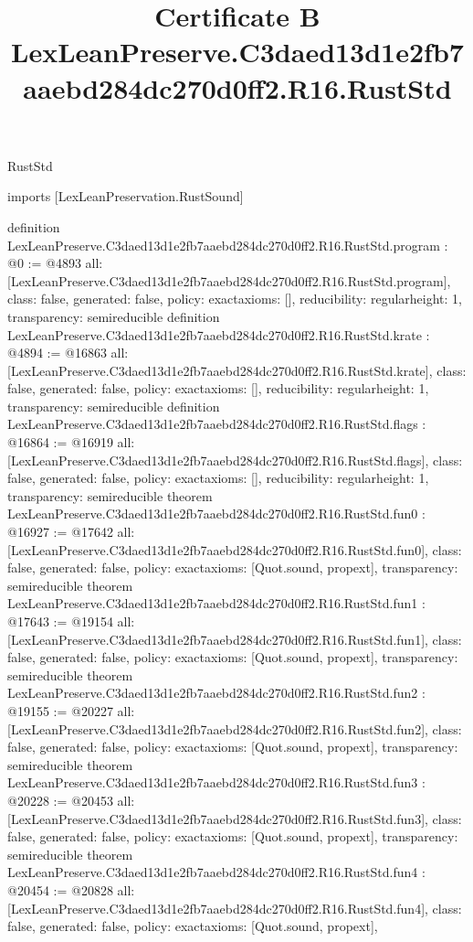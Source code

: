 \begin{lexlean}{RustStd}
\title{Certificate B LexLeanPreserve.C3daed13d1e2fb7aaebd284dc270d0ff2.R16.RustStd}
\begin{coremodule}
imports [LexLeanPreservation.RustSound]

definition LexLeanPreserve.C3daed13d1e2fb7aaebd284dc270d0ff2.R16.RustStd.program : @0 := @4893 {
  all: [LexLeanPreserve.C3daed13d1e2fb7aaebd284dc270d0ff2.R16.RustStd.program],
  class: false,
  generated: false,
  policy: exact{axioms: []},
  reducibility: regular{height: 1},
  transparency: semireducible
}
definition LexLeanPreserve.C3daed13d1e2fb7aaebd284dc270d0ff2.R16.RustStd.krate : @4894 := @16863 {
  all: [LexLeanPreserve.C3daed13d1e2fb7aaebd284dc270d0ff2.R16.RustStd.krate],
  class: false,
  generated: false,
  policy: exact{axioms: []},
  reducibility: regular{height: 1},
  transparency: semireducible
}
definition LexLeanPreserve.C3daed13d1e2fb7aaebd284dc270d0ff2.R16.RustStd.flags : @16864 := @16919 {
  all: [LexLeanPreserve.C3daed13d1e2fb7aaebd284dc270d0ff2.R16.RustStd.flags],
  class: false,
  generated: false,
  policy: exact{axioms: []},
  reducibility: regular{height: 1},
  transparency: semireducible
}
theorem LexLeanPreserve.C3daed13d1e2fb7aaebd284dc270d0ff2.R16.RustStd.fun0 : @16927 := @17642 {
  all: [LexLeanPreserve.C3daed13d1e2fb7aaebd284dc270d0ff2.R16.RustStd.fun0],
  class: false,
  generated: false,
  policy: exact{axioms: [Quot.sound, propext]},
  transparency: semireducible
}
theorem LexLeanPreserve.C3daed13d1e2fb7aaebd284dc270d0ff2.R16.RustStd.fun1 : @17643 := @19154 {
  all: [LexLeanPreserve.C3daed13d1e2fb7aaebd284dc270d0ff2.R16.RustStd.fun1],
  class: false,
  generated: false,
  policy: exact{axioms: [Quot.sound, propext]},
  transparency: semireducible
}
theorem LexLeanPreserve.C3daed13d1e2fb7aaebd284dc270d0ff2.R16.RustStd.fun2 : @19155 := @20227 {
  all: [LexLeanPreserve.C3daed13d1e2fb7aaebd284dc270d0ff2.R16.RustStd.fun2],
  class: false,
  generated: false,
  policy: exact{axioms: [Quot.sound, propext]},
  transparency: semireducible
}
theorem LexLeanPreserve.C3daed13d1e2fb7aaebd284dc270d0ff2.R16.RustStd.fun3 : @20228 := @20453 {
  all: [LexLeanPreserve.C3daed13d1e2fb7aaebd284dc270d0ff2.R16.RustStd.fun3],
  class: false,
  generated: false,
  policy: exact{axioms: [Quot.sound, propext]},
  transparency: semireducible
}
theorem LexLeanPreserve.C3daed13d1e2fb7aaebd284dc270d0ff2.R16.RustStd.fun4 : @20454 := @20828 {
  all: [LexLeanPreserve.C3daed13d1e2fb7aaebd284dc270d0ff2.R16.RustStd.fun4],
  class: false,
  generated: false,
  policy: exact{axioms: [Quot.sound, propext]},
}
\end{coremodule}
\end{lexlean}
